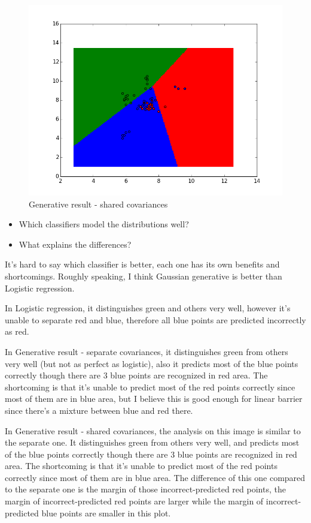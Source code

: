 \documentclass[submit]{harvardml}
\begin{document}
\begin{figure}[h]
    \centering
    \includegraphics[width=400pt]{generative_result_shared_covariances}
    \caption{Generative result - shared covariances}
\end{figure}

\begin{itemize}
\item Which classifiers model the distributions well? 
\item What explains the differences?
\end{itemize}

It's hard to say which classifier is better, each one has its own benefits and shortcomings. Roughly speaking, I think Gaussian generative is better than Logistic regression.

In Logistic regression, it distinguishes green and others very well, however it's unable to separate red and blue, therefore all blue points are predicted incorrectly as red.

In Generative result - separate covariances, it distinguishes green from others very well (but not as perfect as logistic), also it predicts most of the blue points correctly though there are 3 blue points are recognized in red area. The shortcoming is that it's unable to predict most of the red points correctly since most of them are in blue area, but I believe this is good enough for linear barrier since there's a mixture between blue and red there.

In Generative result - shared covariances, the analysis on this image is similar to the separate one. It distinguishes green from others very well, and predicts most of the blue points correctly though there are 3 blue points are recognized in red area. The shortcoming is that it's unable to predict most of the red points correctly since most of them are in blue area. The difference of this one compared to the separate one is the margin of those incorrect-predicted red points, the margin of incorrect-predicted red points are larger while the margin of incorrect-predicted blue points are smaller in this plot.
\end{document}

